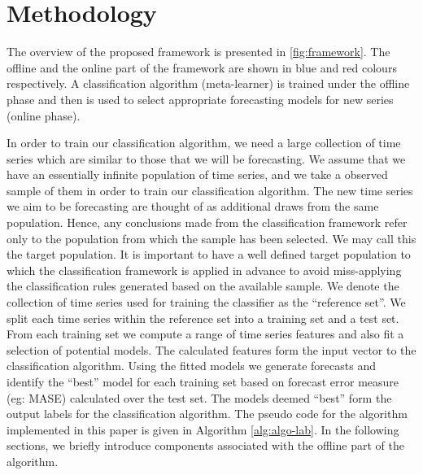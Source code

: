 \documentclass[11pt,]{article}
\theoremstyle{definition}
\theoremstyle{definition}
\theoremstyle{definition}
\theoremstyle{remark}
\begin{document}
\section{Methodology}\label{methodology}

The overview of the proposed framework is presented in
\autoref{fig:framework}. The offline and the online part of the
framework are shown in blue and red colours respectively. A
classification algorithm (meta-learner) is trained under the offline
phase and then is used to select appropriate forecasting models for new
series (online phase).

In order to train our classification algorithm, we need a large
collection of time series which are similar to those that we will be
forecasting. We assume that we have an essentially infinite population
of time series, and we take a observed sample of them in order to train
our classification algorithm. The new time series we aim to be
forecasting are thought of as additional draws from the same population.
Hence, any conclusions made from the classification framework refer only
to the population from which the sample has been selected. We may call
this the target population. It is important to have a well defined
target population to which the classification framework is applied in
advance to avoid miss-applying the classification rules generated based
on the available sample. We denote the collection of time series used
for training the classifier as the ``reference set''. We split each time
series within the reference set into a training set and a test set. From
each training set we compute a range of time series features and also
fit a selection of potential models. The calculated features form the
input vector to the classification algorithm. Using the fitted models we
generate forecasts and identify the ``best'' model for each training set
based on forecast error measure (eg: MASE) calculated over the test set.
The models deemed ``best'' form the output labels for the classification
algorithm. The pseudo code for the algorithm implemented in this paper
is given in Algorithm \autoref{alg:algo-lab}. In the following sections,
we briefly introduce components associated with the offline part of the
algorithm.
\end{document}
